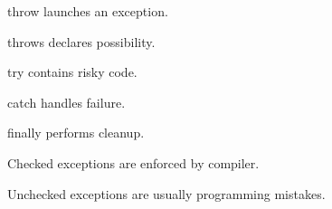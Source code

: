 \documentclass[11pt,a4paper]{book}
\begin{document}

\begin{rosettarule}

throw launches an exception.

\end{rosettarule}


\begin{rosettarule}

throws declares possibility.

\end{rosettarule}


\begin{rosettarule}

try contains risky code.

\end{rosettarule}


\begin{rosettarule}

catch handles failure.

\end{rosettarule}


\begin{rosettarule}

finally performs cleanup.

\end{rosettarule}


\begin{rosettarule}

Checked exceptions are enforced by compiler.

\end{rosettarule}


\begin{rosettarule}

Unchecked exceptions are usually programming mistakes.

\end{rosettarule}
\end{document}
